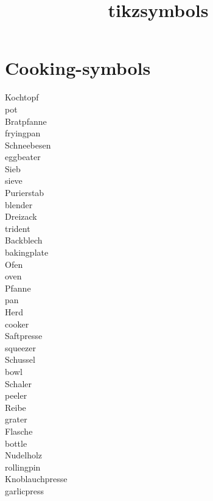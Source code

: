 \documentclass[]{article}
\begin{document}
\title{tikzsymbols}
\author{}
\maketitle


\section{Cooking-symbols}

\begin{flushleft}
Kochtopf \Kochtopf \\
pot \pot \\
Bratpfanne \Bratpfanne \\
fryingpan \fryingpan \\
Schneebesen \Schneebesen \\
eggbeater \eggbeater \\
Sieb \Sieb \\
sieve \sieve \\
Purierstab \Purierstab \\
blender \blender \\
Dreizack \Dreizack \\
trident \trident \\
Backblech \Backblech \\
bakingplate \bakingplate \\
Ofen \Ofen \\
oven \oven \\
Pfanne \Pfanne \\
pan \pan \\
Herd \Herd \\
cooker \cooker \\
Saftpresse \Saftpresse \\
squeezer \squeezer \\
Schussel \Schussel \\
bowl \bowl \\
Schaler \Schaler \\
peeler \peeler \\
Reibe \Reibe \\
grater \grater \\
Flasche \Flasche \\
bottle \bottle \\
Nudelholz \Nudelholz \\
rollingpin \rollingpin \\
Knoblauchpresse \Knoblauchpresse \\
garlicpress \garlicpress \\
\end{flushleft}
\end{document}
